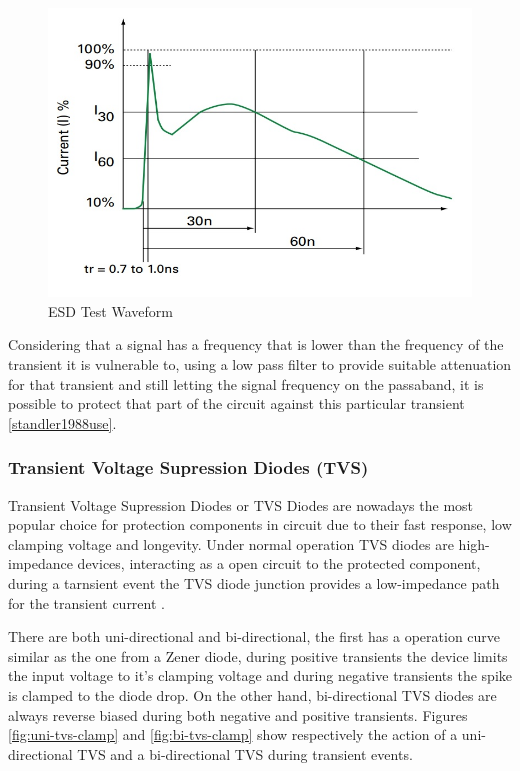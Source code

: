 	\begin{figure}[htbp]
		\centering
			\includegraphics[scale=0.6]{figuras/fig-esd-test-waveform}
		\caption{ESD Test Waveform \cite{esd-test-waveform}}
		\label{fig:esd-test-waveform}
	\end{figure}

	Considering that a signal has a frequency that is lower than the frequency of the transient it is vulnerable to, using a low pass filter to provide suitable attenuation for that transient and still letting the signal frequency on the passaband, it is possible to protect that part of the circuit against this particular transient \ref{standler1988use}. 


\subsubsection{Transient Voltage Supression Diodes (TVS)}\label{sssec:tvsTransientProtection}

	\label{ssssec:tvsOperation}
		Transient Voltage Supression Diodes or TVS Diodes are nowadays the most popular choice for protection components in circuit due to their fast response, low clamping voltage and longevity. Under normal operation TVS diodes are high-impedance devices, interacting as a open circuit to the protected component, during a tarnsient event the TVS diode junction provides a low-impedance path for the transient current \cite{renesasTVS}.
		\par
		There are both uni-directional and bi-directional, the first has a operation curve similar as the one from a Zener diode, during positive transients the device limits the input voltage to it's clamping voltage and during negative transients the spike is clamped to the diode drop. On the other hand, bi-directional TVS diodes are always reverse biased during both negative and positive transients. Figures \ref{fig:uni-tvs-clamp} and \ref{fig:bi-tvs-clamp} show respectively the action of a uni-directional TVS and a bi-directional TVS during transient events.

